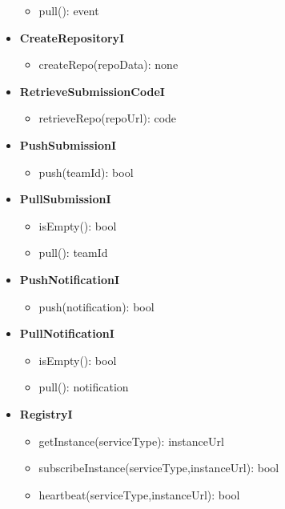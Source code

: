 \begin{itemize}
\begin{itemize}
        \item pull(): event
    \end{itemize}
    \item \textbf{CreateRepositoryI}
    \begin{itemize}
        \item createRepo(repoData): none
    \end{itemize}
    \item \textbf{RetrieveSubmissionCodeI}
    \begin{itemize}
        \item retrieveRepo(repoUrl): code
    \end{itemize}
    \newpage
    \item \textbf{PushSubmissionI}
    \begin{itemize}
        \item push(teamId): bool
    \end{itemize}
    \item \textbf{PullSubmissionI}
    \begin{itemize}
        \item isEmpty(): bool
        \item pull(): teamId
    \end{itemize}
    \item \textbf{PushNotificationI}
    \begin{itemize}
        \item push(notification): bool
    \end{itemize}
    \item \textbf{PullNotificationI}
    \begin{itemize}
        \item isEmpty(): bool
        \item pull(): notification
    \end{itemize}
    \item \textbf{RegistryI}
    \begin{itemize}
        \item getInstance(serviceType): instanceUrl
        \item subscribeInstance(serviceType,instanceUrl): bool
        \item heartbeat(serviceType,instanceUrl): bool
    \end{itemize}
\end{itemize}

